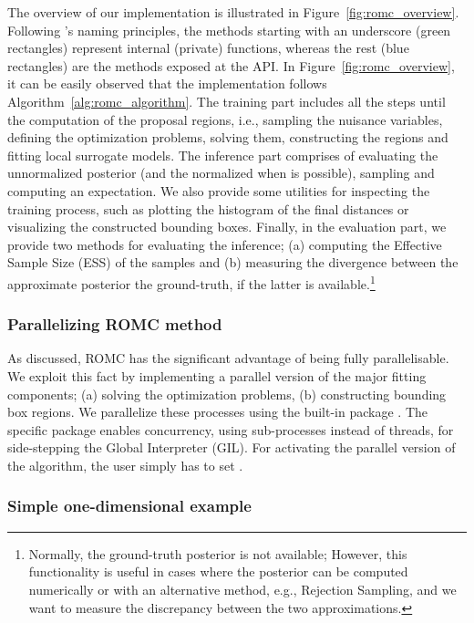 \documentclass[article]{jss}
\begin{document}
The overview of our implementation is illustrated in
Figure~\ref{fig:romc_overview}. Following 's naming
principles, the methods starting with an underscore (green rectangles)
represent internal (private) functions, whereas the rest (blue
rectangles) are the methods exposed at the API. In
Figure~\ref{fig:romc_overview}, it can be easily observed that the
implementation follows Algorithm~\ref{alg:romc_algorithm}. The
training part includes all the steps until the computation of the
proposal regions, i.e., sampling the nuisance variables, defining the
optimization problems, solving them, constructing the regions and
fitting local surrogate models. The inference part comprises of
evaluating the unnormalized posterior (and the normalized when is
possible), sampling and computing an expectation. We also provide some
utilities for inspecting the training process, such as plotting the
histogram of the final distances or visualizing the constructed
bounding boxes. Finally, in the evaluation part, we provide two
methods for evaluating the inference; (a) computing the Effective
Sample Size (ESS) of the samples and (b) measuring the divergence
between the approximate posterior the ground-truth, if the latter is
available.\footnote{Normally, the ground-truth posterior is not
  available; However, this functionality is useful in cases where the
  posterior can be computed numerically or with an alternative method,
  e.g., Rejection Sampling, and we want to measure the discrepancy
  between the two approximations.}

\subsubsection*{Parallelizing ROMC method}

As discussed, ROMC has the significant advantage of being fully
parallelisable. We exploit this fact by implementing a parallel
version of the major fitting components; (a) solving the optimization
problems, (b) constructing bounding box regions. We parallelize these
processes using the built-in  package
. The specific package enables concurrency, using
sub-processes instead of threads, for side-stepping the Global
Interpreter (GIL). For activating the parallel version of the
algorithm, the user simply has to set .

\subsubsection*{Simple one-dimensional example}
\end{document}
